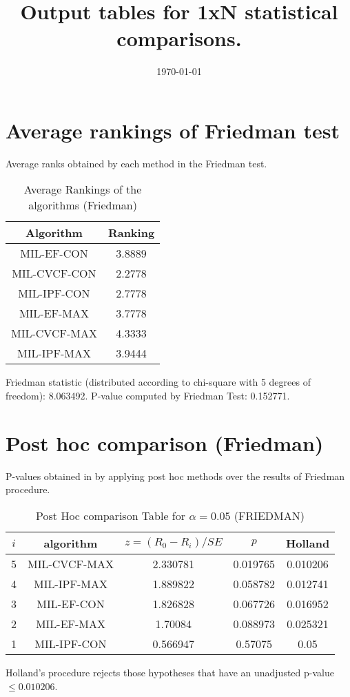 \documentclass[a4paper,10pt]{article}
\title{Output tables for 1xN statistical comparisons.}
\author{}
\date{\today}
\begin{document}
\begin{landscape}
\pagestyle{empty}
\maketitle
\thispagestyle{empty}

\section{Average rankings of Friedman test}


Average ranks obtained by each method in the Friedman test.

\begin{table}[!htp]
\centering
\begin{tabular}{|c|c|}\hline
Algorithm&Ranking\\\hline
MIL-EF-CON&3.8889\\MIL-CVCF-CON&2.2778\\MIL-IPF-CON&2.7778\\MIL-EF-MAX&3.7778\\MIL-CVCF-MAX&4.3333\\MIL-IPF-MAX&3.9444\\\hline\end{tabular}
\caption{Average Rankings of the algorithms (Friedman)}
\end{table}

Friedman statistic (distributed according to chi-square with 5 degrees of freedom): 8.063492. \newline P-value computed by Friedman Test: 0.152771.\newline


\newpage

\section{Post hoc comparison (Friedman)}


P-values obtained in by applying post hoc methods over the results of Friedman procedure.

\begin{table}[!htp]
\centering\footnotesize
\begin{tabular}{ccccc}
$i$&algorithm&$z=(R_0 - R_i)/SE$&$p$&Holland\\
\hline5&MIL-CVCF-MAX&2.330781&0.019765&0.010206\\4&MIL-IPF-MAX&1.889822&0.058782&0.012741\\3&MIL-EF-CON&1.826828&0.067726&0.016952\\2&MIL-EF-MAX&1.70084&0.088973&0.025321\\1&MIL-IPF-CON&0.566947&0.57075&0.05\\\hline
\end{tabular}
\caption{Post Hoc comparison Table for $\alpha=0.05$ (FRIEDMAN)}
\end{table}Holland's procedure rejects those hypotheses that have an unadjusted p-value $\le0.010206$.



\end{landscape}
\end{document}
